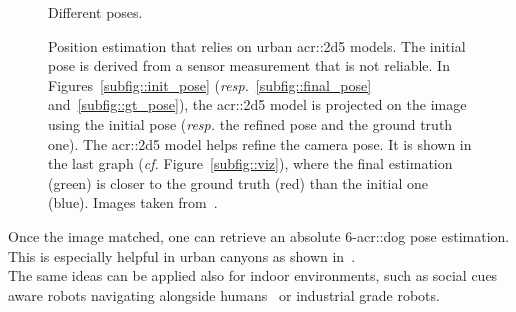 \begin{figure}[htpb]
{\begin{subfloatrow}[5]
{                        }{
                            \caption{\label{subfig::viz} Different poses.}
                        }
                    \end{subfloatrow}
                }
                {
                    \caption[
                        Position estimation that relies on urban \gls{acr::2d5} models.
                    ]{
                        \label{fig::navigation}
                        Position estimation that relies on urban \gls{acr::2d5} models.
                        The initial pose is derived from a sensor measurement that is not reliable.
                        In Figures~\ref{subfig::init_pose} (\textit{resp.}~\ref{subfig::final_pose} and~\ref{subfig::gt_pose}), the \gls{acr::2d5} model is projected on the image using the initial pose (\textit{resp.} the refined pose and the ground truth one).
                        The \gls{acr::2d5} model helps refine the camera pose.
                        It is shown in the last graph (\textit{cf.} Figure~\ref{subfig::viz}), where the final estimation (green) is closer to the ground truth (red) than the initial one (blue).
                        Images taken from~\parencite{armagan2017semantic}.
                    }
                }
            \end{figure}

            Once the image matched, one can retrieve an absolute 6-\gls{acr::dog} pose estimation.
            This is especially helpful in urban canyons as shown in~\parencite{piasco2018survey}.\\
            The same ideas can be applied also for indoor environments, such as social cues aware robots navigating alongside humans~\parencite{gupta2018social} or industrial grade robots\addref.
       
